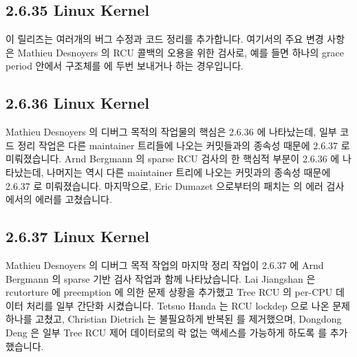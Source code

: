 \subsection{2.6.35 Linux Kernel}

이 릴리즈는 여러개의 버그 수정과 코드 정리를 추가합니다.
여기서의 주요 변경 사항은 Mathieu Desnoyers 의 RCU 콜백의 오용을 위한 검사로,
예를 들면 하나의 grace period 안에서  구조체를  에
두번 보내거나 하는 경우입니다.

\subsection{2.6.36 Linux Kernel}

Mathieu Desnoyers 의 디버그 목적의 작업물의 핵심은 2.6.36 에 나타났는데, 일부
코드 정리 작업은 다른 maintainer 트리들에 나오는 커밋들과의 종속성 때문에
2.6.37 로 미뤄졌습니다.
Arnd Bergmann 의 sparse RCU 검사의 한 핵심적 부분이 2.6.36 에 나타났는데,
나머지는 역시 다른 maintainer 트리에 나오는 커밋과의 종속성 때문에 2.6.37 로
미뤄졌습니다.
마지막으로, Eric Dumazet 으로부터의 패치는  의 에러
검사에서의 에러를 고쳤습니다.

\subsection{2.6.37 Linux Kernel}

Mathieu Desnoyers 의 디버그 목적 작업의 마지막 정리 작업이 2.6.37 에 Arnd
Bergmann 의 sparse 기반 검사 작업과 함께 나타났습니다.
Lai Jiangshan 은 rcutorture 에 preemption 에 의한 문제 상황을 추가했고 Tree RCU
의 per-CPU 데이터 처리를 일부 간단화 시켰습니다.
Tetsuo Handa 는 RCU lockdep 으로 나온 문제 하나를 고쳤고, Christian Dietrich 는
불필요하게 반복된  를 제거했으며, Dongdong Deng 은 일부 Tree RCU
제어 데이터로의 락 없는 액세스를 가능하게 하도록  를
추가했습니다.

